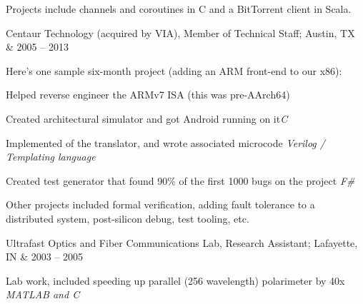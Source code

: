 \documentclass[letterpaper]{scrartcl}
\begin{document}
\begin{list1}
  \begin{list2}
  \item Projects include channels and coroutines in C and a BitTorrent client in Scala.
  \end{list2}
\item \begin{tabular1bold} Centaur Technology (acquired by VIA), Member of Technical Staff; Austin, TX & 2005 -- 2013 \end{tabular1bold}

  \begin{list2}

  \item Here's one sample six-month project (adding an ARM front-end to our x86):
    \begin{list3}
    \item Helped reverse engineer the ARMv7 ISA (this was pre-AArch64)
    \item Created architectural simulator and got Android running on it\hfill \emph{C}
    \item Implemented  of the translator, and wrote associated microcode \hfill \emph{Verilog / Templating language}
    \item Created test generator that found 90\% of the first 1000 bugs on the project \hfill \emph{F\#}
    \end{list3}

  \item Other projects included formal verification, adding fault tolerance to a distributed system, post-silicon debug, test tooling, etc.

  \end{list2}

\item \begin{tabular1bold} Ultrafast Optics and Fiber Communications Lab, Research Assistant; Lafayette, IN & 2003 -- 2005 \end{tabular1bold}

  \begin{list2}
  \item Lab work, included speeding up parallel (256 wavelength) polarimeter by 40x  \hfill \emph{MATLAB and C}
  \end{list2}


\end{list1}
\end{document}
